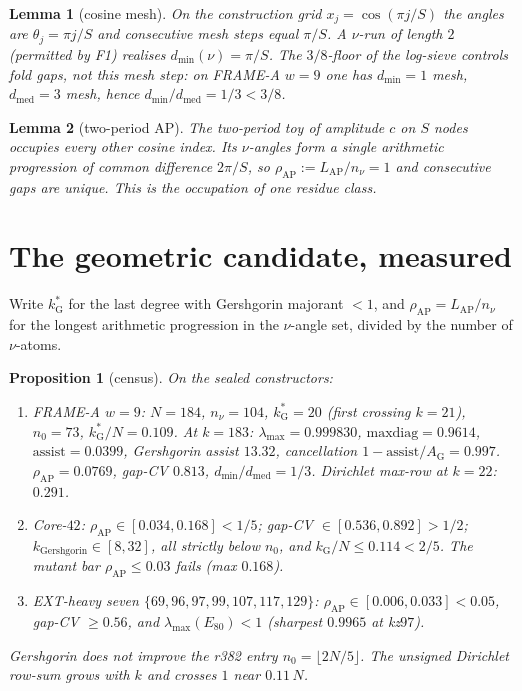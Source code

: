 \documentclass[11pt]{article}
\newtheorem{lemma}{Lemma}
\newtheorem{prop}{Proposition}
\theoremstyle{remark}
\begin{document}
\begin{lemma}[cosine mesh]\label{lem:mesh}
On the construction grid $x_j=\cos(\pi j/S)$ the angles are
$\theta_j=\pi j/S$ and consecutive mesh steps equal $\pi/S$.
A $\nu$-run of length $2$ (permitted by F1) realises
$d_{\min}(\nu)=\pi/S$.  The $3/8$-floor of the log-sieve
controls fold gaps, not this mesh step: on FRAME-A $w=9$ one has
$d_{\min}=1$ mesh, $d_{\mathrm{med}}=3$ mesh, hence
$d_{\min}/d_{\mathrm{med}}=1/3<3/8$.
\end{lemma}

\begin{lemma}[two-period AP]\label{lem:ap}
The two-period toy of amplitude $c$ on $S$ nodes occupies every
other cosine index.  Its $\nu$-angles form a single arithmetic
progression of common difference $2\pi/S$, so
$\rho_{\mathrm{AP}}:=L_{\mathrm{AP}}/n_\nu=1$ and consecutive
gaps are unique.  This is the occupation of one residue class.
\end{lemma}

\section{The geometric candidate, measured}\label{sec:geom}

Write $k^*_{\mathrm{G}}$ for the last degree with Gershgorin
majorant $<1$, and
$\rho_{\mathrm{AP}}=L_{\mathrm{AP}}/n_\nu$ for the longest
arithmetic progression in the $\nu$-angle set, divided by the
number of $\nu$-atoms.

\begin{prop}[census]\label{prop:census}
On the sealed constructors:
\begin{enumerate}
\item FRAME-A $w=9$: $N=184$, $n_\nu=104$,
  $k^*_{\mathrm{G}}=20$ (first crossing $k=21$),
  $n_0=73$, $k^*_{\mathrm{G}}/N=0.109$.
  At $k=183$: $\lambda_{\max}=0.999830$,
  $\mathrm{maxdiag}=0.9614$, $\mathrm{assist}=0.0399$,
  Gershgorin assist $13.32$, cancellation
  $1-\mathrm{assist}/A_{\mathrm{G}}=0.997$.
  $\rho_{\mathrm{AP}}=0.0769$, gap-CV $0.813$,
  $d_{\min}/d_{\mathrm{med}}=1/3$.
  Dirichlet max-row at $k=22$: $0.291$.
\item Core-$42$: $\rho_{\mathrm{AP}}\in[0.034,0.168]<1/5$;
  gap-CV $\in[0.536,0.892]>1/2$;
  $k_{\mathrm{Gershgorin}}\in[8,32]$, all strictly below
  $n_0$, and $k_{\mathrm{G}}/N\le 0.114<2/5$.
  The mutant bar $\rho_{\mathrm{AP}}\le 0.03$ fails
  (max $0.168$).
\item EXT-heavy seven $\{69,96,97,99,107,117,129\}$:
  $\rho_{\mathrm{AP}}\in[0.006,0.033]<0.05$,
  gap-CV $\ge 0.56$, and $\lambda_{\max}(E_{80})<1$
  (sharpest $0.9965$ at kz$97$).
\end{enumerate}
Gershgorin does not improve the r382 entry
$n_0=\lfloor 2N/5\rfloor$.  The unsigned Dirichlet row-sum
grows with $k$ and crosses $1$ near $0.11\,N$.
\end{prop}
\end{document}
